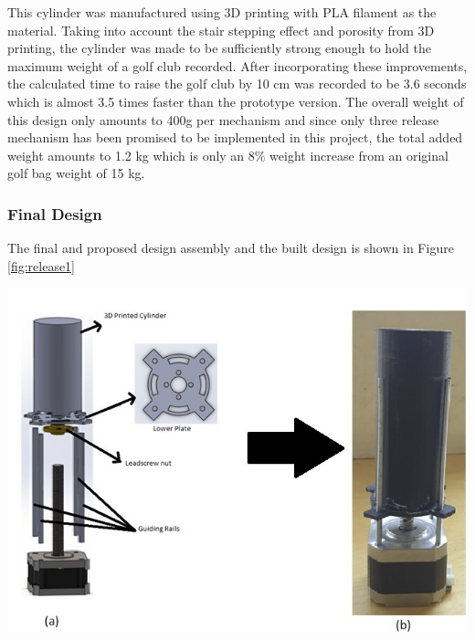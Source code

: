 \documentclass[11pt,landscape]{article}
\newenvironment{Figure}
  {\par\medskip\noindent\minipage{\linewidth}}
  {\endminipage\par\medskip}
\begin{document}
\begin{multicols}{2}
    This cylinder was manufactured using 3D printing with PLA filament as
    the material. Taking into account the stair stepping effect and porosity
    from 3D printing, the cylinder was made to be sufficiently strong enough to
    hold the maximum weight of a golf club recorded. After incorporating these
    improvements, the calculated time to raise the golf club by 10 cm was
    recorded to be 3.6 seconds which is almost 3.5 times faster than the
    prototype version. The overall weight of this design only amounts to 400g
    per mechanism and since only three release mechanism has been promised to be
    implemented in this project, the total added weight amounts to 1.2 kg which
    is only an 8\% weight increase from an original golf bag weight of 15 kg. 
    
    
    \subsubsection{Final Design}
    The final and proposed design assembly and the built design is shown in
    Figure \ref{fig:release1}
    
    \begin{Figure}
        \begin{center}
            \includegraphics[width=\textwidth]{Figure21.jpg}
            \label{fig:release1}
        \end{center}
    \end{Figure}
    
    
\end{multicols}
\end{document}

